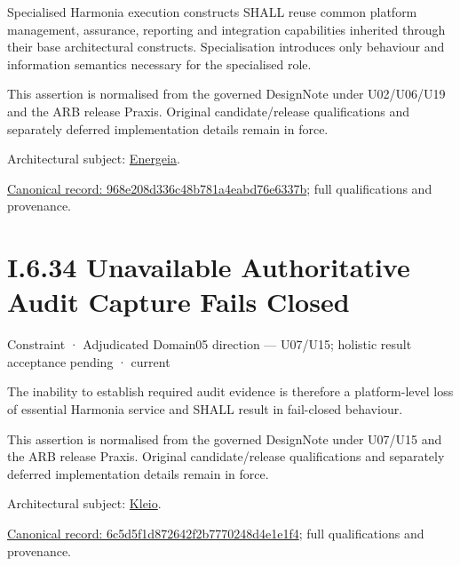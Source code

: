 Specialised Harmonia execution constructs SHALL reuse common platform management, assurance, reporting and integration capabilities inherited through their base architectural constructs. Specialisation introduces only behaviour and information semantics necessary for the specialised role.



This assertion is normalised from the governed DesignNote under U02/U06/U19 and the ARB release Praxis. Original candidate/release qualifications and separately deferred implementation details remain in force.



Architectural subject: \hyperref[element:fb3f37a6ac614415ac486a6de9d35994]{Energeia}.


{\footnotesize \href{../../../../continuum/motivation/constraint/968e208d336c48b781a4eabd76e6337b.md}{Canonical record: 968e208d336c48b781a4eabd76e6337b}; full qualifications and provenance.}\par
\section*{I.6.34 Unavailable Authoritative Audit Capture Fails Closed}
\label{navigation:I.6.34}

\label{element:6c5d5f1d872642f2b7770248d4e1e1f4}
{\small Constraint · Adjudicated Domain05 direction — U07/U15; holistic result acceptance pending · current}\par

The inability to establish required audit evidence is therefore a platform-level loss of essential Harmonia service and SHALL result in fail-closed behaviour.



This assertion is normalised from the governed DesignNote under U07/U15 and the ARB release Praxis. Original candidate/release qualifications and separately deferred implementation details remain in force.



Architectural subject: \hyperref[element:fefda110e2274884ad58906733606efd]{Kleio}.


{\footnotesize \href{../../../../continuum/motivation/constraint/6c5d5f1d872642f2b7770248d4e1e1f4.md}{Canonical record: 6c5d5f1d872642f2b7770248d4e1e1f4}; full qualifications and provenance.}\par
